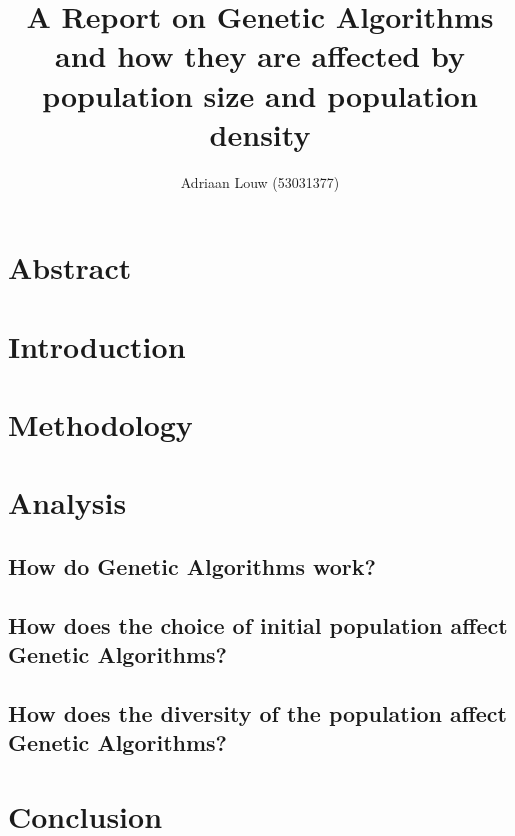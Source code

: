 \documentclass[10pt,a4paper]{report}
\title{A Report on Genetic Algorithms and how they are affected by population size and population density}
\author{ Adriaan Louw (53031377) }
\begin{document}
\maketitle

\tableofcontents

\section{Abstract}

\section{Introduction}

\section{Methodology}

\section{Analysis}

\subsection{How do Genetic Algorithms work?}

\subsection{How does the choice of initial population affect Genetic Algorithms?}

\subsection{How does the diversity of the population affect Genetic Algorithms?}

\section{Conclusion}


\end{document}
